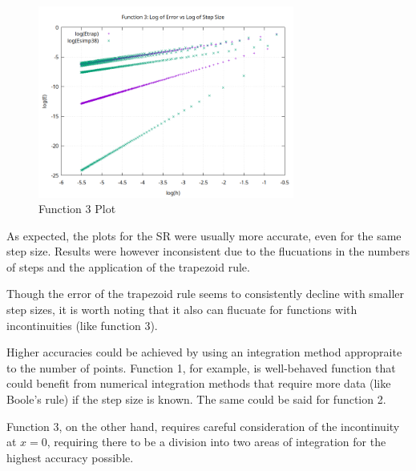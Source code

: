 \documentclass[12pt]{article}
\begin{document}
\begin{figure}[ht]
    \centering
    \includegraphics[width=0.75\textwidth]{./../problem5/data/function3.png}
    \caption{Function 3 Plot}
    \label{fig:fnct3}
\end{figure}

As expected, the plots for the SR were usually more accurate, even for the same step size. Results were however inconsistent due to the flucuations in the numbers of steps and the application of the trapezoid rule. 

Though the error of the trapezoid rule seems to consistently decline with smaller step sizes, it is worth noting that it also can flucuate for functions with incontinuities (like function 3).

Higher accuracies could be achieved by using an integration method appropraite to the number of points. Function 1, for example, is well-behaved function that could benefit from numerical integration methods that require more data (like Boole's rule) if the step size is known. The same could be said for function 2. 

Function 3, on the other hand, requires careful consideration of the incontinuity at \(x = 0\), requiring there to be a division into two areas of integration for the highest accuracy possible. 
\end{document}

